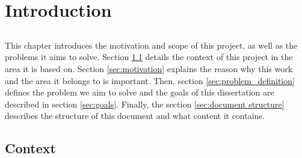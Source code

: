 \chapter{Introduction} \label{chap:intro}

\section*{}

This chapter introduces the motivation and scope of this project, as well as the problems it aims to solve. Section \ref{sec:context} details the context of this project in the area it is based on. Section \ref{sec:motivation} explains the reason why this work and the area it belongs to is important. Then, section \ref{sec:problem_definition} defines the problem we aim to solve and the goals of this dissertation are described in section \ref{sec:goals}. Finally, the section \ref{sec:document structure} describes the structure of this document and what content it contains.

\section{Context} \label{sec:context}

